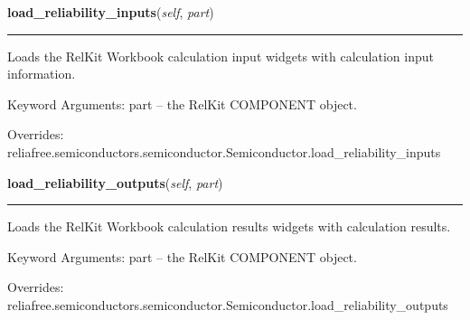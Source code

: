     \vspace{0.5ex}

\hspace{.8\funcindent}\begin{boxedminipage}{\funcwidth}

    \raggedright \textbf{load\_reliability\_inputs}(\textit{self}, \textit{part})

    \vspace{-1.5ex}

    \rule{\textwidth}{0.5\fboxrule}
\setlength{\parskip}{2ex}
    Loads the RelKit Workbook calculation input widgets with calculation
    input information.

    Keyword Arguments: part -- the RelKit COMPONENT object.

\setlength{\parskip}{1ex}
      Overrides: reliafree.semiconductors.semiconductor.Semiconductor.load\_reliability\_inputs

    \end{boxedminipage}

    \vspace{0.5ex}

\hspace{.8\funcindent}\begin{boxedminipage}{\funcwidth}

    \raggedright \textbf{load\_reliability\_outputs}(\textit{self}, \textit{part})

    \vspace{-1.5ex}

    \rule{\textwidth}{0.5\fboxrule}
\setlength{\parskip}{2ex}
    Loads the RelKit Workbook calculation results widgets with 
    calculation results.

    Keyword Arguments: part -- the RelKit COMPONENT object.

\setlength{\parskip}{1ex}
      Overrides: reliafree.semiconductors.semiconductor.Semiconductor.load\_reliability\_outputs

    \end{boxedminipage}

    \vspace{0.5ex}


